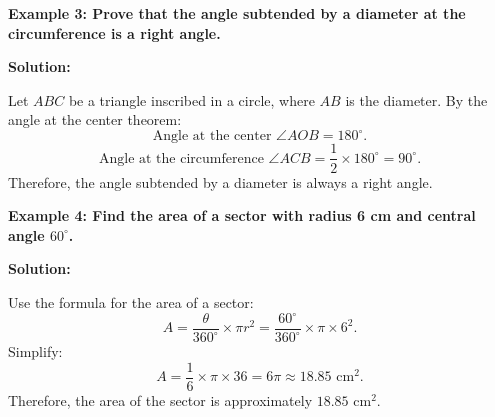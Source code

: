 \begin{flushleft}
	\textbf{Example 3: Prove that the angle subtended by a diameter at the circumference is a right angle.}
	
	\vspace{0.5cm}
	\textbf{Solution:}
	\vspace{0.5cm}
	
	Let $ABC$ be a triangle inscribed in a circle, where $AB$ is the diameter. By the angle at the center theorem:
	\[
	\text{Angle at the center } \angle AOB = 180^\circ.
	\]
	\[
	\text{Angle at the circumference } \angle ACB = \frac{1}{2} \times 180^\circ = 90^\circ.
	\]
	Therefore, the angle subtended by a diameter is always a right angle.
\end{flushleft}

\begin{flushleft}
	\textbf{Example 4: Find the area of a sector with radius 6 cm and central angle $60^\circ$.}
	
	\vspace{0.5cm}
	\textbf{Solution:}
	\vspace{0.5cm}
	
	Use the formula for the area of a sector:
	\[
	A = \frac{\theta}{360^\circ} \times \pi r^2 = \frac{60^\circ}{360^\circ} \times \pi \times 6^2.
	\]
	Simplify:
	\[
	A = \frac{1}{6} \times \pi \times 36 = 6\pi \approx 18.85 \text{ cm}^2.
	\]
	Therefore, the area of the sector is approximately $18.85 \text{ cm}^2$.
\end{flushleft}

